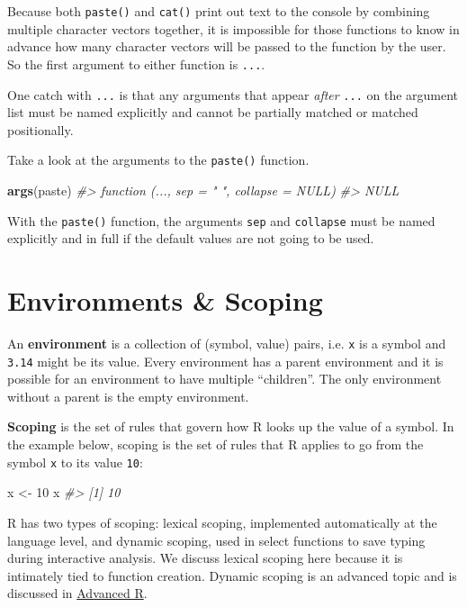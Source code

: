 \documentclass[]{book}
\newenvironment{Shaded}{\begin{snugshade}}{\end{snugshade}}
\newcommand{\KeywordTok}[1]{\textcolor[rgb]{0.13,0.29,0.53}{\textbf{#1}}}
\newcommand{\DecValTok}[1]{\textcolor[rgb]{0.00,0.00,0.81}{#1}}
\newcommand{\StringTok}[1]{\textcolor[rgb]{0.31,0.60,0.02}{#1}}
\newcommand{\CommentTok}[1]{\textcolor[rgb]{0.56,0.35,0.01}{\textit{#1}}}
\newcommand{\NormalTok}[1]{#1}
\theoremstyle{definition}
\theoremstyle{definition}
\theoremstyle{definition}
\theoremstyle{remark}
\begin{document}
Because both \texttt{paste()} and \texttt{cat()} print out text to the
console by combining multiple character vectors together, it is
impossible for those functions to know in advance how many character
vectors will be passed to the function by the user. So the first
argument to either function is \texttt{...}.

One catch with \texttt{...} is that any arguments that appear
\emph{after} \texttt{...} on the argument list must be named explicitly
and cannot be partially matched or matched positionally.

Take a look at the arguments to the \texttt{paste()} function.

\begin{Shaded}
\begin{Highlighting}[]
\KeywordTok{args}\NormalTok{(paste)}
\CommentTok{#> function (..., sep = " ", collapse = NULL) }
\CommentTok{#> NULL}
\end{Highlighting}
\end{Shaded}

With the \texttt{paste()} function, the arguments \texttt{sep} and
\texttt{collapse} must be named explicitly and in full if the default
values are not going to be used.

\section{Environments \& Scoping}\label{environments-scoping}

An \textbf{environment} is a collection of (symbol, value) pairs, i.e.
\texttt{x} is a symbol and \texttt{3.14} might be its value. Every
environment has a parent environment and it is possible for an
environment to have multiple ``children''. The only environment without
a parent is the empty environment.

\textbf{Scoping} is the set of rules that govern how R looks up the
value of a symbol. In the example below, scoping is the set of rules
that R applies to go from the symbol \texttt{x} to its value
\texttt{10}:

\begin{Shaded}
\begin{Highlighting}[]
\NormalTok{x <-}\StringTok{ }\DecValTok{10}
\NormalTok{x}
\CommentTok{#> [1] 10}
\end{Highlighting}
\end{Shaded}

R has two types of scoping: lexical scoping, implemented automatically
at the language level, and dynamic scoping, used in select functions to
save typing during interactive analysis. We discuss lexical scoping here
because it is intimately tied to function creation. Dynamic scoping is
an advanced topic and is discussed in
\href{http://adv-r.had.co.nz}{Advanced R}.
\end{document}
